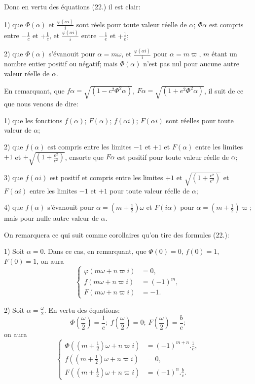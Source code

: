 \documentclass{article}
\begin{document}
Donc en vertu des équations (22.) il est clair:

1) que $\Phi(\alpha)$ et $\frac{\varphi(\alpha i)}{i}$ sont réels pour toute valeur réelle de $\alpha$; $\Phi\alpha$ est compris entre $-\frac{1}{c}$ et $+\frac{1}{c}$, et $\frac{\varphi(\alpha i)}{i}$ entre $-\frac{1}{e}$ et $+\frac{1}{e}$;

2) que $\Phi(\alpha)$ s'évanouit pour $\alpha=m\omega$, et $\frac{\varphi(\alpha i)}{i}$ pour $\alpha=m\varpi$, $m$ étant un nombre entier positif ou négatif; mais $\Phi(\alpha)$ n'est pas nul pour aucune autre valeur réelle de $\alpha$.

En remarquant, que $f\alpha=\sqrt{(1-c^{2}\Phi^{2}\alpha)}$, $F\alpha=\sqrt{(1+e^{2}\Phi^{2}\alpha)}$, il suit de ce que nous venons de dire:

1) que les fonctions $f(\alpha)$; $F(\alpha)$; $f(\alpha i)$; $F(\alpha i)$ sont réelles pour toute valeur de $\alpha$;

2) que $f(\alpha)$ est compris entre les limites $-1$ et $+1$ et $F(\alpha)$ entre les limites $+1$ et $+\sqrt{\left(1+\frac{e^{2}}{c^{2}}\right)}$, ensorte que $F\alpha$ est positif pour toute valeur réelle de $\alpha$;

3) que $f(\alpha i)$ est positif et compris entre les limites $+1$ et $\sqrt{\left(1+\frac{c^{2}}{e^{2}}\right)}$ et $F(\alpha i)$ entre les limites $-1$ et $+1$ pour toute valeur réelle de $\alpha$;


4) que $f(\alpha)$ s'évanouit pour $\alpha=(m+\frac{1}{2})\omega$ et $F(i\alpha)$ pour $\alpha=(m+\frac{1}{2})\varpi$; mais pour nulle autre valeur de $\alpha$.

On remarquera ce qui suit comme corollaires qu'on tire des formules (22.):

1) Soit $\alpha=0$. Dans ce cas, en remarquant, que $\Phi(0)=0$, $f(0)=1$, $F(0)=1$, on aura
\[ \left\{\begin{aligned} \varphi(m\omega+n\varpi i)&=0,\\ f(m\omega+n\varpi i)&=(-1)^{m},\\ F(m\omega+n\varpi i)&=-1. \end{aligned}\right. \tag{23.} \]

2) Soit $\alpha=\frac{\omega}{2}$. En vertu des équations:
\[ \Phi\left(\frac{\omega}{2}\right)=\frac{1}{c};\ f\left(\frac{\omega}{2}\right)=0;\ F\left(\frac{\omega}{2}\right)=\frac{b}{c}; \]
on aura
\[ \left\{\begin{aligned} \Phi((m+\tfrac{1}{2})\omega+n\varpi i)&=(-1)^{m+n}.\frac{1}{c},\\ f((m+\tfrac{1}{2})\omega+n\varpi i)&=0,\\ F((m+\tfrac{1}{2})\omega+n\varpi i)&=(-1)^{n}.\frac{b}{c}. \end{aligned}\right. \tag{24.} \]
\end{document}
